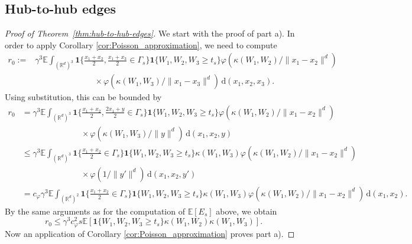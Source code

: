 \documentclass{article}
\theoremstyle{definition}
\numberwithin{equation}{section}
\theoremstyle{remark}
\begin{document}
\subsection{Hub-to-hub edges}


\begin{proof}[Proof of Theorem~\ref{thm:hub-to-hub-edges}]
We start with the proof of part a). In order to apply Corollary \ref{cor:Poisson_approximation}, we need to compute
\begin{align*}
r_0:= & \gamma^3 \mathbb{E} \int_{(\mathbb{R}^d)^3} \mathbf{1}\bigg\{ \frac{x_1+x_2}{2}, \frac{x_1+x_3}{2}\in \Gamma_s \bigg\} \mathbf{1}\{W_1,W_2,W_3\geq t_s\} \varphi(\kappa(W_1,W_2)/\|x_1-x_2\|^d) \\
& \hspace{3cm} \times \varphi(\kappa(W_1,W_3)/\|x_1-x_3\|^d) \, \mathrm{d}(x_1,x_2,x_3).
\end{align*}
Using substitution, this can be bounded by
\begin{align*}
r_0 & = \gamma^3 \mathbb{E} \int_{(\mathbb{R}^d)^3} \mathbf{1}\bigg\{ \frac{x_1+x_2}{2}, \frac{2x_1+y}{2}\in \Gamma_s \bigg\} \mathbf{1}\{W_1,W_2,W_3\geq t_s\} \varphi(\kappa(W_1,W_2)/\|x_1-x_2\|^d) \\
& \hspace{3cm} \times \varphi(\kappa(W_1,W_3)/\|y\|^d) \, \mathrm{d}(x_1,x_2,y) \\
& \leq \gamma^3 \mathbb{E} \int_{(\mathbb{R}^d)^3} \mathbf{1}\bigg\{ \frac{x_1+x_2}{2}\in \Gamma_s \bigg\} \mathbf{1}\{W_1,W_2,W_3\geq t_s\}\kappa(W_1,W_3) \varphi(\kappa(W_1,W_2)/\|x_1-x_2\|^d) \\
& \hspace{3cm} \times \varphi(1/\|y'\|^d) \, \mathrm{d}(x_1,x_2,y') \\
& = c_\varphi \gamma^3 \mathbb{E} \int_{(\mathbb{R}^d)^2} \mathbf{1}\bigg\{ \frac{x_1+x_2}{2}\in \Gamma_s \bigg\} \mathbf{1}\{W_1,W_2,W_3\geq t_s\}\kappa(W_1,W_3) \varphi(\kappa(W_1,W_2)/\|x_1-x_2\|^d) \, \mathrm{d}(x_1,x_2).
\end{align*}
By the same arguments as for the computation of $\mathbb{E}[E_s]$ above, we obtain
$$
r_0 \leq \gamma^3 c_\varphi^2 s \mathbb{E}[ \mathbf{1}\{ W_1,W_2,W_3\geq t_s \} \kappa(W_1,W_2) \kappa(W_1,W_3)] .
$$
Now an application of Corollary \ref{cor:Poisson_approximation} proves part a).


\end{proof}
\end{document}
